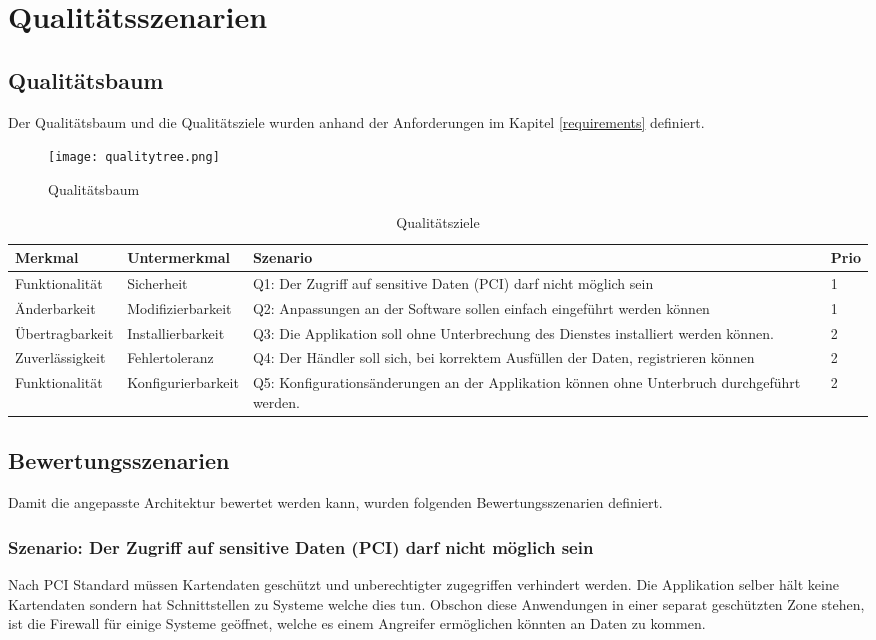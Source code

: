 \chapter{Qualitätsszenarien}
\label{sec:qualityscenarios}
\section{Qualitätsbaum}

Der Qualitätsbaum und die Qualitätsziele wurden anhand der Anforderungen im Kapitel \ref{requirements} definiert.

\begin{figure}[H]
	\centering
	\texttt{[image: qualitytree.png]}
	\caption{Qualitätsbaum}
\end{figure}

\begin{table}[H]
	\centering
	\caption{Qualitätsziele}
	\begin{tabular}{ | p{3cm} | p{3.5cm} | p{6.5cm} | p{1cm} | }
		\toprule
		{\textbf{Merkmal}} & {\textbf{Untermerkmal}} & {\textbf{Szenario}} & {\textbf{Prio}} \\
		\midrule
		Funktionalität & Sicherheit & Q1: Der Zugriff auf sensitive Daten (PCI) darf nicht möglich sein & 1 \\ \hline
		Änderbarkeit & Modifizierbarkeit & Q2: Anpassungen an der Software sollen einfach eingeführt werden können & 1 \\ \hline
		Übertragbarkeit & Installierbarkeit & Q3: Die Applikation soll ohne Unterbrechung des Dienstes installiert werden können. & 2 \\ \hline
		Zuverlässigkeit & Fehlertoleranz & Q4: Der Händler soll sich, bei korrektem Ausfüllen der Daten, registrieren können & 2 \\ \hline
		Funktionalität & Konfigurierbarkeit & Q5: Konfigurationsänderungen an der Applikation können ohne Unterbruch durchgeführt werden. & 2 \\
		\bottomrule
	\end{tabular}
\end{table}
\newpage
\section{Bewertungsszenarien}

Damit die angepasste Architektur bewertet werden kann, wurden folgenden Bewertungsszenarien definiert. 

\subsection{Szenario: Der Zugriff auf sensitive Daten (PCI) darf nicht möglich sein}
Nach PCI Standard müssen Kartendaten geschützt und unberechtigter zugegriffen verhindert werden. Die Applikation selber hält keine Kartendaten sondern hat Schnittstellen zu Systeme welche dies tun. Obschon diese Anwendungen in einer separat geschützten Zone stehen, ist die Firewall für einige Systeme geöffnet, welche es einem Angreifer ermöglichen könnten an Daten zu kommen.


